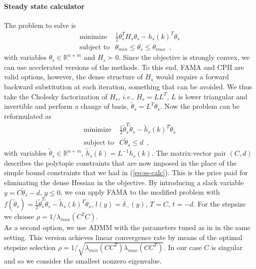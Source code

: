 \documentclass[openany]{now}
\newcommand{\ie}{{\it i.e.}}
\newcommand{\reals}{{\mathbb R}}
\begin{document}
\paragraph{Steady state calculator} The problem to solve is
\begin{equation}   \label{eq:ss-calc}
  \begin{array}{ll}
    \mbox{minimize} & \frac{1}{2}\theta_s^TH_s\theta_s - h_s(k)^T\theta_s  \\
    \mbox{subject to} & \theta_{min}\le \theta_s\le\theta_{max}\enspace,
  \end{array}
\end{equation}
with variables $\theta_s\in\reals^{n+m}$ and $H_s\succ 0$.
Since the objective is strongly convex, we can use accelerated versions of the methods. To this end, FAMA and CPII are valid options, however, the dense structure of $H_s$ would require a forward backward substitution at each iteration, something that can be avoided.
We thus take the Cholesky factorization of $H_s$, \ie, $H_s=LL^T$, $L$ is lower triangular and invertible and perform a change of basis, $\tilde{\theta}_s=L^T\theta_s$. Now the problem can be reformulated as
\begin{equation}   \label{eq:ss-calc_ref}
  \begin{array}{ll}
    \mbox{minimize} & \frac{1}{2}\tilde{\theta}_s^T\tilde{\theta}_s - \tilde{h}_s(k)^T\tilde{\theta}_s  \\
    \mbox{subject to} & C \tilde{\theta}_s\le d\enspace,
  \end{array}
\end{equation}
with variables $\tilde{\theta}_s\in\reals^{n+m}$, $\tilde{h}_s(k)=L^{-1}h_s(k)$. The matrix-vector pair $(C,d)$ describes the polytopic constraints that are now imposed in the place of the simple bound constraints that we had in (\ref{eq:ss-calc}). This is the price paid for eliminating the dense Hessian in the objective. 
By introducing a slack variable $y=C \tilde{\theta}_s-d$, $y\le 0$, we can apply FAMA to the modified problem with $f(\tilde{\theta}_s) = \frac{1}{2}\tilde{\theta}_s^T\tilde{\theta}_s- \tilde{h}_s(k)^T\tilde{\theta}_s$, $l(y)=\delta_-(y)$, $T=C$, $t=-d$. For the stepsize we choose $\rho=1/\lambda_{max}(C^TC)$.\\

As a second option, we use ADMM with the parameters tuned as in \cite{ghadimi2013optimal} in the same setting. This version achieves linear convergence rate by means of the optimal stepsize selection $\rho=1/\sqrt{\lambda_{min}(CC^T)\lambda_{max}(CC^T)}$. In our case $C$ is singular and so we consider the smallest nonzero eigenvalue.\\
\end{document}
